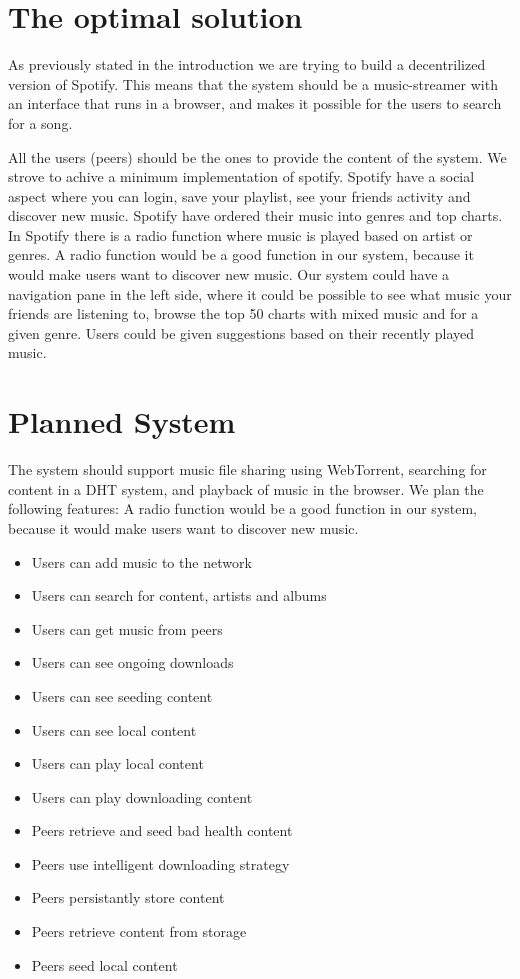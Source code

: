 \section{The optimal solution}
As previously stated in the introduction we are trying to build a decentrilized version of Spotify.
This means that the system should be a music-streamer with an interface that runs in a browser,
and makes it possible for the users to search for a song.

All the users (peers) should be the ones to provide the content of the system.
We strove to achive a minimum implementation of spotify.
Spotify have a social aspect where you can login, save your playlist, see your friends activity and discover new music.
Spotify have ordered their music into genres and top charts.
In Spotify there is a radio function where music is played based on artist or genres.
A radio function would be a good function in our system, because it would make users want to discover new music.
Our system could have a navigation pane in the left side,
 where it could be possible to see what music your friends are listening to,
  browse the top 50 charts with mixed music and for a given genre.
Users could be given suggestions based on their recently played music.

\section{Planned System}
The system should support music file sharing using WebTorrent,
searching for content in a DHT system,
and playback of music in the browser.
We plan the following features:
A radio function would be a good function in our system, because it would make users want to discover new music.
\begin{itemize}
	\item Users can add music to the network
	\item Users can search for content, artists and albums
	\item Users can get music from peers
	\item Users can see ongoing downloads
	\item Users can see seeding content
	\item Users can see local content
	\item Users can play local content
	\item Users can play downloading content
	\item Peers retrieve and seed bad health content
	\item Peers use intelligent downloading strategy
	\item Peers persistantly store content
	\item Peers retrieve content from storage
	\item Peers seed local content
\end{itemize}

